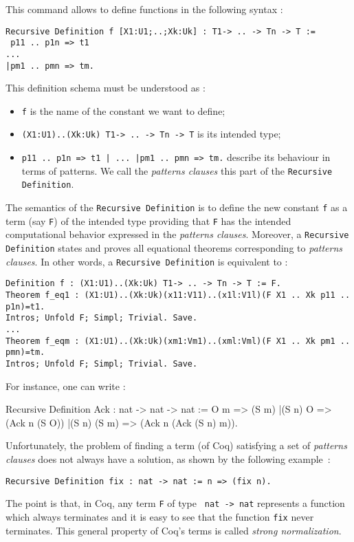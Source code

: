 

\newcommand{\xx}{\noindent}
\newcommand{\Coq}{{\sf Coq}}




This command allows to define functions in
the following syntax :
\begin{verbatim}
Recursive Definition f [X1:U1;..;Xk:Uk] : T1-> .. -> Tn -> T :=
 p11 .. p1n => t1
...
|pm1 .. pmn => tm.
\end{verbatim}
This definition schema must be understood as :
\begin{itemize}
\item {\tt f} is the name of the constant we want
to define;
\item {\tt (X1:U1)..(Xk:Uk) T1-> .. -> Tn -> T}
is its intended type;
\item {\tt  p11 .. p1n => t1 | ... |pm1 .. pmn => tm.}
describe its beha\-viour in terms of patterns.
We
call the {\sl patterns clauses} this part of the {\tt Recursive Definition}.
\end{itemize}
The semantics of the {\tt Recursive Definition} 
is to
define the new constant {\tt f} as a term (say {\tt F}) of
the intended type providing that {\tt F} has the intended
computational behavior expressed in the {\sl patterns
clauses}. Moreover, a {\tt Recursive Definition} states and
proves all equational theorems corresponding to {\sl
patterns clauses}. In other words, a {\tt Recursive Definition} is
equivalent to :
\begin{verbatim}
Definition f : (X1:U1)..(Xk:Uk) T1-> .. -> Tn -> T := F.
Theorem f_eq1 : (X1:U1)..(Xk:Uk)(x11:V11)..(x1l:V1l)(F X1 .. Xk p11 .. p1n)=t1.
Intros; Unfold F; Simpl; Trivial. Save.
...
Theorem f_eqm : (X1:U1)..(Xk:Uk)(xm1:Vm1)..(xml:Vml)(F X1 .. Xk pm1 .. pmn)=tm.
Intros; Unfold F; Simpl; Trivial. Save.
\end{verbatim}
For instance, one can write :
\begin{coq_example}
Recursive Definition Ack : nat -> nat -> nat :=
  O m => (S m)
 |(S n) O => (Ack n (S O))
 |(S n) (S m) => (Ack n (Ack (S n) m)).
\end{coq_example}

Unfortunately, the problem of finding a term (of \Coq)
satisfying a set of {\sl patterns clauses} does not always have a
solution, as shown by the following example~:\\
\centerline {\tt Recursive Definition fix :
nat -> nat := n => (fix n).} 
The point is that, in \Coq, any term {\tt F} of type {\tt
nat -> nat} represents a function which always terminates
and it is easy to see that the function {\tt fix} never
terminates. This general property of \Coq's terms is called
{\it strong normalization}.

